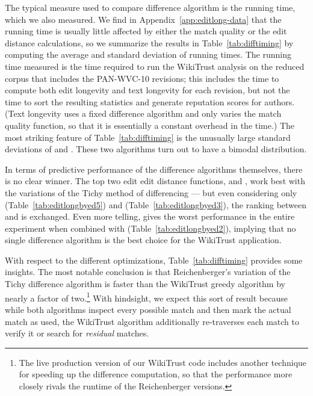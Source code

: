 

The typical measure used to compare difference algorithm is the
running time, which we also measured.
We find in Appendix~\ref{app:editlong-data} that the running time
is usually little affected by either the
match quality or the edit distance calculations, so we
summarize the results in Table~\ref{tab:difftiming} by
computing the average and standard deviation of running times.
The running time measured is the time required to run the
WikiTrust analysis on the reduced corpus that includes
the PAN-WVC-10 revisions; this includes the time to compute
both edit longevity and text longevity for each revision,
but not the time to sort the resulting statistics and generate
reputation scores for authors.
(Text longevity uses a fixed difference algorithm and only varies
the match quality function, so that it is essentially a constant
overhead in the time.)
The most striking feature of Table~\ref{tab:difftiming} is the unusually
large standard deviations of  and .
These two algorithms turn out to have a bimodal distribution.

In terms of predictive performance of the difference algorithms
themselves, there is no clear winner.
The top two edit edit distance functions,  and ,
work best with the variations of the Tichy method of differencing ---
but even considering only  (Table~\ref{tab:editlongbyed5})
and  (Table~\ref{tab:editlongbyed3}), the ranking between 
and  is exchanged.
Even more telling,  gives the worst performance in the entire
experiment when combined with  (Table~\ref{tab:editlongbyed2}),
implying that no single difference algorithm is the best choice for
the WikiTrust application.

With respect to the different optimizations, Table~\ref{tab:difftiming}
provides some insights.
The most notable conclusion is that Reichenberger's
variation of the Tichy difference algorithm is faster than the WikiTrust
greedy algorithm by nearly a factor of two.\footnote{The live
production version of our WikiTrust code includes another technique
for speeding up the difference computation, so that the performance
more closely rivals the runtime of the Reichenberger versions.}
With hindsight, we expect this sort of result because while both algorithms
inspect every possible match and then mark the actual
match as used, the WikiTrust algorithm additionally
re-traverses each match to verify it or search for
\textit{residual} matches.

